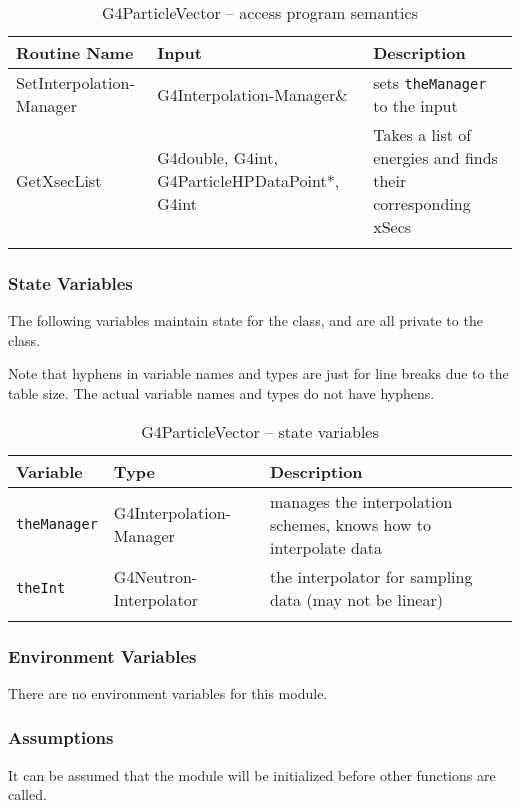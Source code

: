 \documentclass[12pt]{article}
\begin{document}
\begin{longtable}{p{}p{}p{}}
\caption{G4ParticleVector -- access program semantics}\label{Table_NeutronHPVectorSemantics}\\
\toprule
\bf Routine Name & \bf Input & \bf Description \\\midrule
\arrayrulecolor{lightgray}
SetInterpolation-Manager & G4Interpolation-Manager\& & sets \texttt{theManager} to the input \\\hline
GetXsecList & G4double, G4int, G4ParticleHPDataPoint*, G4int & Takes a list of energies and finds their corresponding xSecs\\\hline
\arrayrulecolor{black}
\bottomrule
\end{longtable}

\subsubsection{State Variables}%
The following variables maintain state for the class, and are all private to the class.

Note that hyphens in variable names and types are just for line breaks due to the table size. The actual variable names and types do not have hyphens.

\begin{table}[h]
\caption{G4ParticleVector -- state variables}\label{Table_NeutronHPDataPointStateVariables}
\begin{tabularx}{\textwidth}{p{}p{}p{}}
\toprule
\bf Variable & \bf Type & \bf Description\\\midrule
\arrayrulecolor{lightgray}
\texttt{theManager} & G4Interpolation-Manager & manages the interpolation schemes, knows how to interpolate data\\\hline
\texttt{theInt} & G4Neutron-Interpolator & the interpolator for sampling data (may not be linear)\\
\arrayrulecolor{black}
\bottomrule
\end{tabularx}
\end{table}
\subsubsection{Environment Variables}%
There are no environment variables for this module.

\subsubsection{Assumptions}%
It can be assumed that the module will be initialized before other functions are called.
\end{document}
